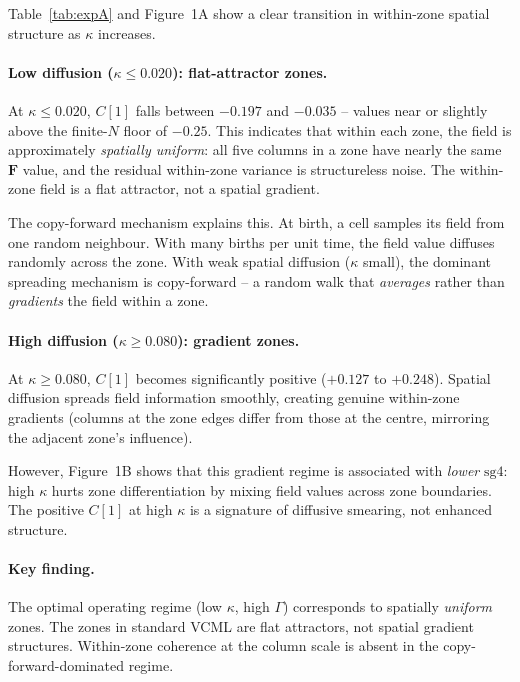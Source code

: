 \documentclass[11pt,a4paper]{article}
\begin{document}
Table~\ref{tab:expA} and Figure~1A show a clear transition in within-zone spatial
structure as $\kappa$ increases.

\paragraph{Low diffusion ($\kappa \leq 0.020$): flat-attractor zones.}
At $\kappa \leq 0.020$, $C[1]$ falls between $-0.197$ and $-0.035$ -- values near or
slightly above the finite-$N$ floor of $-0.25$.  This indicates that within each zone,
the field is approximately \emph{spatially uniform}: all five columns in a zone have
nearly the same $\mathbf{F}$ value, and the residual within-zone variance is
structureless noise.  The within-zone field is a flat attractor, not a spatial gradient.

The copy-forward mechanism explains this.  At birth, a cell samples its field from one
random neighbour.  With many births per unit time, the field value diffuses randomly
across the zone.  With weak spatial diffusion ($\kappa$ small), the dominant spreading
mechanism is copy-forward -- a random walk that \emph{averages} rather than
\emph{gradients} the field within a zone.

\paragraph{High diffusion ($\kappa \geq 0.080$): gradient zones.}
At $\kappa \geq 0.080$, $C[1]$ becomes significantly positive ($+0.127$ to $+0.248$).
Spatial diffusion spreads field information smoothly, creating genuine within-zone
gradients (columns at the zone edges differ from those at the centre, mirroring the
adjacent zone's influence).

However, Figure~1B shows that this gradient regime is associated with \emph{lower}
$\mathrm{sg4}$: high $\kappa$ hurts zone differentiation by mixing field values across
zone boundaries.  The positive $C[1]$ at high $\kappa$ is a signature of diffusive
smearing, not enhanced structure.

\paragraph{Key finding.}
The optimal operating regime (low $\kappa$, high $\Gamma$) corresponds to spatially
\emph{uniform} zones.  The zones in standard VCML are flat attractors, not spatial
gradient structures.  Within-zone coherence at the column scale is absent in the
copy-forward-dominated regime.
\end{document}
